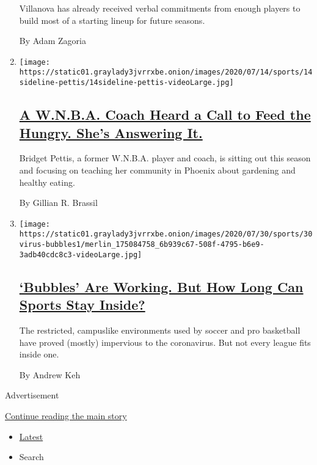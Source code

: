 \begin{enumerate}
  Villanova has already received verbal commitments from enough players
  to build most of a starting lineup for future seasons.

  By Adam Zagoria
\item
  \texttt{[image: https://static01.graylady3jvrrxbe.onion/images/2020/07/14/sports/14sideline-pettis/14sideline-pettis-videoLarge.jpg]}

  \hypertarget{a-wnba-coach-heard-a-call-to-feed-the-hungry-shes-answering-it}{%
  \subsection{\texorpdfstring{\href{/2020/07/30/sports/basketball/wnba-bridget-pettis.html}{A
  W.N.B.A. Coach Heard a Call to Feed the Hungry. She's Answering
  It.}}{A W.N.B.A. Coach Heard a Call to Feed the Hungry. She's Answering It.}}\label{a-wnba-coach-heard-a-call-to-feed-the-hungry-shes-answering-it}}

  Bridget Pettis, a former W.N.B.A. player and coach, is sitting out
  this season and focusing on teaching her community in Phoenix about
  gardening and healthy eating.

  By Gillian R. Brassil
\item
  \texttt{[image: https://static01.graylady3jvrrxbe.onion/images/2020/07/30/sports/30virus-bubbles1/merlin\_175084758\_6b939c67-508f-4795-b6e9-3adb40cdc8c3-videoLarge.jpg]}

  \hypertarget{bubbles-are-working-but-how-long-can-sports-stay-inside}{%
  \subsection{\texorpdfstring{\href{/2020/07/30/sports/basketball/sports-bubble-nba-mlb.html}{`Bubbles'
  Are Working. But How Long Can Sports Stay
  Inside?}}{`Bubbles' Are Working. But How Long Can Sports Stay Inside?}}\label{bubbles-are-working-but-how-long-can-sports-stay-inside}}

  The restricted, campuslike environments used by soccer and pro
  basketball have proved (mostly) impervious to the coronavirus. But not
  every league fits inside one.

  By Andrew Keh
\end{enumerate}

Advertisement

\protect\hyperlink{after-mid1}{Continue reading the main story}

\begin{itemize}
\tightlist
\item
  \protect\hyperlink{stream-panel}{Latest}
\item
  Search
\end{itemize}

